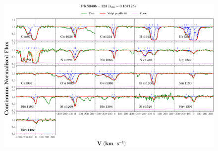 \documentclass[12pt]{report}
\begin{document}
\begin{landscape}

\begin{figure}
    \centering
    \vspace{-20mm}
    \hspace*{-35mm}
    \includegraphics[width=1.25\linewidth]{System-Plots/PKS0405-123_z=0.167125_sys_plot.png}
\end{figure}

\end{landscape}
\end{document}

